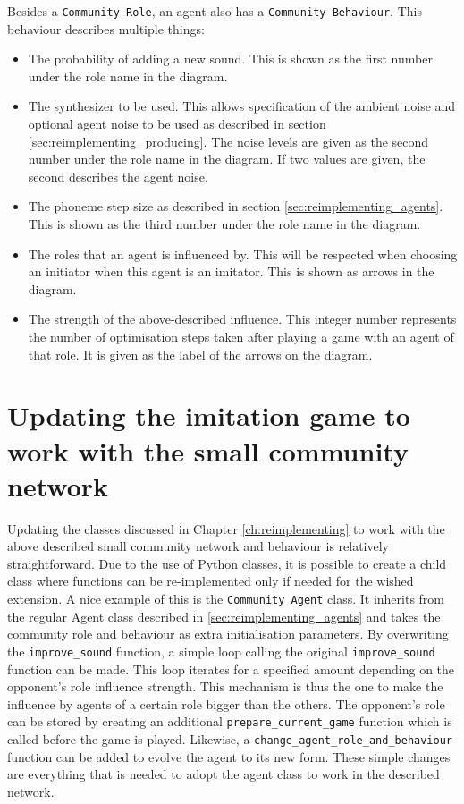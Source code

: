 Besides a \texttt{Community Role}, an agent also has a \texttt{Community Behaviour}.
This behaviour describes multiple things:
\begin{itemize}
    \item The probability of adding a new sound. This is shown as the first number under the role name in the diagram.
    \item The synthesizer to be used. This allows specification of the ambient noise and optional agent noise to be used as described in section \ref{sec:reimplementing_producing}. The noise levels are given as the second number under the role name in the diagram. If two values are given, the second describes the agent noise.
    \item The phoneme step size as described in section \ref{sec:reimplementing_agents}. This is shown as the third number under the role name in the diagram.
    \item The roles that an agent is influenced by. This will be respected when choosing an initiator when this agent is an imitator. This is shown as arrows in the diagram.
    \item The strength of the above-described influence. This integer number represents the number of optimisation steps taken after playing a game with an agent of that role. It is given as the label of the arrows on the diagram.
    
\end{itemize}



\section{Updating the imitation game to work with the small community network}
\label{sec:updating_immitation_game}

Updating the classes discussed in Chapter \ref{ch:reimplementing} to work with the above described small community network and behaviour is relatively straightforward.
Due to the use of Python classes, it is possible to create a child class where functions can be re-implemented only if needed for the wished extension.
A nice example of this is the \texttt{Community Agent} class.
It inherits from the regular Agent class described in \ref{sec:reimplementing_agents} and takes the community role and behaviour as extra initialisation parameters.
By overwriting the \texttt{improve\_sound} function, a simple loop calling the original \texttt{improve\_sound} function can be made.
This loop iterates for a specified amount depending on the opponent's role influence strength.
This mechanism is thus the one to make the influence by agents of a certain role bigger than the others.
The opponent's role can be stored by creating an additional \texttt{prepare\_current\_game} function which is called before the game is played.
Likewise, a \texttt{change\_agent\_role\_and\_behaviour} function can be added to evolve the agent to its new form.
These simple changes are everything that is needed to adopt the agent class to work in the described network.

